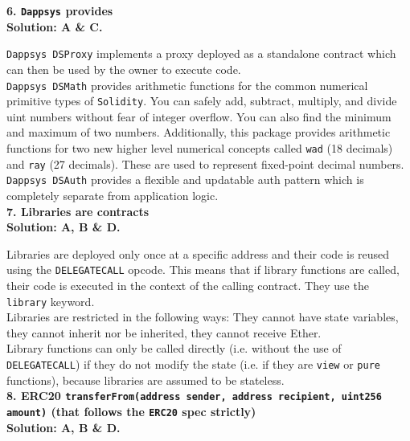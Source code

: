 \textbf{6. \texttt{Dappsys} provides}\label{sec:exam3_q6}\\

\textbf{Solution: A \& C.}

\verb|Dappsys DSProxy| implements a proxy deployed as a standalone contract which can then be used by the owner to execute code.\\

\verb|Dappsys DSMath| provides arithmetic functions for the common numerical primitive types of \verb|Solidity|.
You can safely add, subtract, multiply, and divide uint numbers without fear of integer overflow.
You can also find the minimum and maximum of two numbers.
Additionally, this package provides arithmetic functions for two new higher level numerical concepts called \verb|wad| (18 decimals) and \verb|ray| (27 decimals).
These are used to represent fixed-point decimal numbers.\\

\verb|Dappsys DSAuth| provides a flexible and updatable auth pattern which is completely separate from application logic.\\

\textbf{7. Libraries are contracts}\label{sec:exam3_q7}\\

\textbf{Solution: A, B \& D.}

Libraries are deployed only once at a specific address and their code is reused using the \verb|DELEGATECALL| opcode.
This means that if library functions are called, their code is executed in the context of the calling contract.
They use the \verb|library| keyword.\\

Libraries are restricted in the following ways: They cannot have state variables, they cannot inherit nor be inherited, they cannot receive Ether.\\

Library functions can only be called directly (i.e. without the use of \verb|DELEGATECALL|) if they do not modify the state (i.e. if they are \verb|view| or \verb|pure| functions), because libraries are assumed to be stateless.\\

\textbf{8.  ERC20 \texttt{transferFrom(address sender, address recipient, uint256 amount)} (that follows the \texttt{ERC20} spec strictly)}\label{sec:exam3_q8}\\

\textbf{Solution: A, B \& D.}

